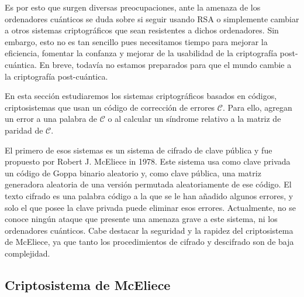Es por esto que surgen diversas preocupaciones, ante la amenaza de los ordenadores cuánticos se duda sobre si seguir usando RSA o simplemente cambiar a otros sistemas criptográficos que sean resistentes a dichos ordenadores. Sin embargo, esto no es tan sencillo pues necesitamos tiempo para mejorar la eficiencia, fomentar la confanza y mejorar de la usabilidad de la criptografía post-cuántica. En breve, todavía no estamos preparados para que el mundo cambie a la criptografía post-cuántica.

En esta sección estudiaremos los sistemas criptográficos basados en códigos, criptosistemas que usan un código de corrección de errores $\mathcal{C}$. Para ello, agregan un error a una palabra de $\mathcal{C}$ o al calcular un síndrome relativo a la matriz de paridad de $\mathcal{C}$.

El primero de esos sistemas es un sistema de cifrado de clave pública y fue propuesto por Robert J. McEliece in 1978. Este sistema usa como clave privada un código de Goppa binario aleatorio y, como clave pública, una matriz generadora aleatoria de una versión permutada aleatoriamente de ese código. El texto cifrado es una palabra código a la que se le han añadido algunos errores, y solo el que posee la clave privada puede eliminar esos errores. Actualmente, no se conoce ningún ataque que presente una amenaza grave a este sistema, ni los ordenadores cuánticos. Cabe destacar la seguridad y la rapidez del criptosistema de McEliece, ya que tanto los procedimientos de cifrado y descifrado son de baja complejidad.

\subsection{Criptosistema de McEliece}

